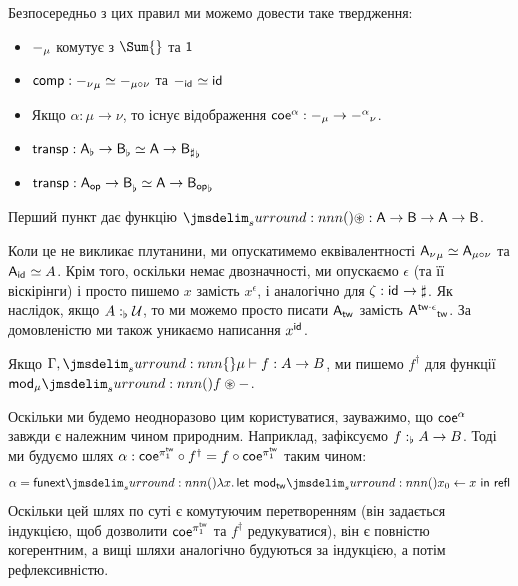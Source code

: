 \documentclass[12pt]{article}
\newcommand{\textcite}{\cite}
\newcommand{\Equiv}{\mathrel{\simeq}}
\newcommand{\GM}{\flat}
\newcommand{\SM}{\sharp}
\newcommand{\OM}{\mathsf{op}}
\newcommand{\TM}{\mathsf{tw}}
\let\prn\DelimPrn
\begin{document}
Безпосередньо з цих правил ми можемо довести таке твердження:
\begin{prop}[\textcite{gratzer:2020}]
  \label{thm:prelims:mtt-facts}
  \leavevmode
  \begin{itemize}
  \item $\Modify[\mu]{-}$ комутує з $\Sum{}$ та $\ObjTerm{}$
  \item $\Con{comp} : \Modify[\mu]{\Modify[\nu]{-}} \Equiv \Modify[\mu\circ\nu]{-}$ та $\Modify[\ArrId{}]{-} \Equiv \ArrId{}$
  \item Якщо $\alpha : \mu \to \nu$, то існує відображення $\Coe^{\alpha} : \Modify[\mu]{{-}} \to \Modify[\nu]{-^\alpha}$.
  \item $\Con{transp} : \Modify[\GM]{\Modify[\GM]{A} \to B} \Equiv \Modify[\GM]{A \to \Modify[\SM]{B}}$
  \item $\Con{transp} : \Modify[\GM]{\Modify[\OM]{A} \to B} \Equiv \Modify[\GM]{A \to \Modify[\OM]{B}}$
  \end{itemize}
  Перший пункт дає функцію $\prn{\circledast} : \Modify{A \to B} \to \Modify{A} \to \Modify{B}$.
\end{prop}

Коли це не викликає плутанини, ми опускатимемо еквівалентності $\Modify[\mu]{\Modify[\nu]{A}} \Equiv \Modify[\mu\circ\nu]{A}$ та $\Modify[\ArrId{}]{A} \Equiv A$. Крім того, оскільки немає двозначності, ми опускаємо $\epsilon$ (та її віскірінги) і просто пишемо $x$ замість $x^\epsilon$, і аналогічно для $\zeta : \ArrId{} \to \SM$. Як наслідок, якщо $\DeclVar{A}{\GM}{\Uni}$, то ми можемо просто писати $\Modify[\TM]{A}$ замість $\Modify[\TM]{A^{\TM\Whisker\epsilon}}$. За домовленістю ми також уникаємо написання $x^{\ArrId{}}$.

\begin{nota}
  Якщо $\IsTm[\LockCxV{\Gamma}]{f}{A \to B}$, ми пишемо $f^\dagger$ для функції $\MkMod[\mu]{f} \mathbin{\circledast} -$.
\end{nota}

\begin{rem}\label{rem:prelims:coe-natural}
  Оскільки ми будемо неодноразово цим користуватися, зауважимо, що $\mathsf{coe}^\alpha$ завжди є належним чином природним. Наприклад, зафіксуємо $\DeclVar{f}{\GM}{A \to B}$. Тоді ми будуємо шлях $\alpha : \Coe^{\pi_1^\TM} \circ f^\dagger = f \circ \Coe^{\pi_1^\TM}$ таким чином:
  \[
    \alpha = \Con{funext}\prn{\lambda x.\,\LetMod[\TM]{x}[x_0]{\Refl}}
  \]
  Оскільки цей шлях по суті є комутуючим перетворенням (він задається індукцією, щоб дозволити $\Coe^{\pi_1^\TM}$ та $f^\dagger$ редукуватися), він є повністю когерентним, а вищі шляхи аналогічно будуються за індукцією, а потім рефлексивністю.
\end{rem}
\end{document}
